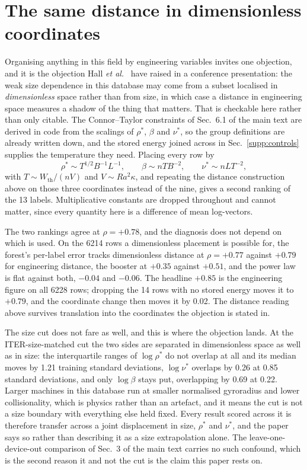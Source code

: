 \documentclass[12pt,letterpaper]{article}
\begin{document}
\section{The same distance in dimensionless coordinates}
\label{supp:dimensionless}

 Organising anything
in this field by engineering variables invites one objection, and it is the
objection Hall \emph{et al.}~\cite{hall26} have raised in a conference presentation: the weak size dependence in
this database may come from a subset localised in \emph{dimensionless} space
rather than from size, in which case a distance in engineering space measures a
shadow of the thing that matters. That is checkable here rather than only
citable. The Connor--Taylor constraints of Sec.~6.1 of the main text are
derived in code from the scalings of $\rho^{*}$, $\beta$ and $\nu^{*}$, so the
group definitions are already written down, and the stored energy joined across
in Sec.~\ref{supp:controls} supplies the temperature they need. Placing every
row by
\begin{equation}
\rho^{*}\sim T^{1/2}B^{-1}L^{-1},\qquad
\beta\sim nTB^{-2},\qquad
\nu^{*}\sim nLT^{-2},
\label{eq:supp-groups-empirical}
\end{equation}
with $T\sim W_{\mathrm{th}}/(nV)$ and $V\sim Ra^{2}\kappa$, and repeating the
distance construction above on those three coordinates instead of the nine,
gives a second ranking of the 13 labels. Multiplicative constants are dropped
throughout and cannot matter, since every quantity here is a difference of mean
log-vectors.

The two rankings agree at $\rho=+0.78$, and the diagnosis does not depend on
which is used. On the 6214 rows a dimensionless placement is possible for, the
forest's per-label error tracks dimensionless distance at $\rho=+0.77$ against
$+0.79$ for engineering distance, the booster at $+0.35$ against $+0.51$, and
the power law is flat against both, $-0.04$ and $-0.06$. The headline $+0.85$ is
the engineering figure on all 6228 rows; dropping the 14 rows with no stored
energy moves it to $+0.79$, and the coordinate change then moves it by 0.02.
The distance reading above survives translation into the coordinates the
objection is stated in.

The size cut does not fare as well, and this is where the objection lands. At
the ITER-size-matched cut the two sides are separated in dimensionless space as
well as in size: the interquartile ranges of $\log\rho^{*}$ do not overlap at
all and its median moves by 1.21 training standard deviations, $\log\nu^{*}$
overlaps by 0.26 at 0.85 standard deviations, and only $\log\beta$ stays put,
overlapping by 0.69 at 0.22. Larger machines in this database run at smaller
normalised gyroradius and lower collisionality, which is physics rather than an
artefact, and it means the cut is not a size boundary with everything else held
fixed. Every result scored across it is therefore transfer across a joint
displacement in size, $\rho^{*}$ and $\nu^{*}$, and the paper says so rather
than describing it as a size extrapolation alone. The leave-one-device-out
comparison of Sec.~3 of the main text carries no such confound, which is the
second reason it and not the cut is the claim this paper rests on.
\end{document}
